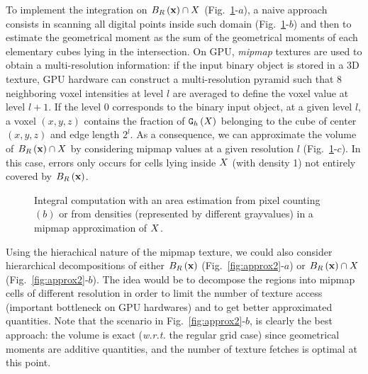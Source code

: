 \documentclass{llncs}
\newcommand{\wrt}{\emph{w.r.t.} }
\begin{document}
To implement the integration on $B_{R}\left(\mathbf{x}\right) \cap X$
(Fig.~\ref{fig:approx}-$a$), a naive approach consists in scanning all
digital points inside such domain (Fig.~\ref{fig:approx}-$b$) and then
to estimate the geometrical moment as the sum of the geometrical
moments of each elementary cubes lying in the intersection. On GPU,
\emph{mipmap} textures are used to obtain a multi-resolution information: if the
input binary object is stored in a 3D texture, GPU hardware can
construct a multi-resolution pyramid such that 8 neighboring voxel
intensities at level $l$ are averaged to define the voxel value at
level $l+1$. If the level 0 corresponds to the binary input object, at
a given level $l$, a voxel $(x,y,z)$ contains the fraction of $\mathtt{G}_{h}\left(X\right)$
belonging to the cube of center $(x,y,z)$ and edge length $2^l$. As a
consequence, we can approximate the volume of $B_{R}\left(\mathbf{x}\right)\cap X$ by
considering mipmap values at a given resolution $l$
(Fig.~\ref{fig:approx}-$c$). In this case, errors only occurs for
cells lying inside $X$ (with density 1) not entirely covered by
$B_{R}\left(\mathbf{x}\right)$.
\begin{figure}
  \begin{center}
  \end{center}
  \caption{Integral computation with an area estimation from pixel
    counting $(b)$ or from densities (represented by different
    grayvalues) in a mipmap approximation of $X$.}
  \label{fig:approx}
\end{figure}

Using the hierachical nature of the mipmap texture, we could also
consider hierarchical decompositions of either $B_{R}\left(\mathbf{x}\right)$
(Fig.~\ref{fig:approx2}-$a$) or $B_{R}\left(\mathbf{x}\right)\cap X$
(Fig.~\ref{fig:approx2}-$b$). The idea would be to decompose the
regions into mipmap cells of different resolution in order to limit
the number of texture access (important bottleneck on GPU hardwares)
and to get better approximated quantities. Note that the scenario in
Fig.~\ref{fig:approx2}-$b$, is clearly the best approach: the
volume is exact  (\wrt the regular grid case) since geometrical moments
are additive quantities, and the number of texture fetches is  optimal
at this point.
\end{document}
